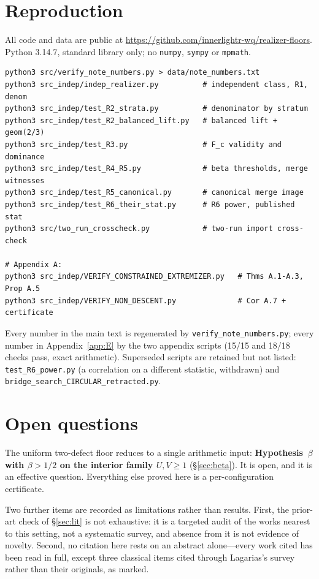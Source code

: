 \documentclass[11pt,a4paper]{article}
\theoremstyle{plain}
\theoremstyle{definition}
\begin{document}
\section{Reproduction}

All code and data are public at
\url{https://github.com/innerlightr-wq/realizer-floors}.
Python 3.14.7, standard library only; no \texttt{numpy}, \texttt{sympy} or
\texttt{mpmath}.

\begin{verbatim}
python3 src/verify_note_numbers.py > data/note_numbers.txt
python3 src_indep/indep_realizer.py          # independent class, R1, denom
python3 src_indep/test_R2_strata.py          # denominator by stratum
python3 src_indep/test_R2_balanced_lift.py   # balanced lift + geom(2/3)
python3 src_indep/test_R3.py                 # F_c validity and dominance
python3 src_indep/test_R4_R5.py              # beta thresholds, merge witnesses
python3 src_indep/test_R5_canonical.py       # canonical merge image
python3 src_indep/test_R6_their_stat.py      # R6 power, published stat
python3 src/two_run_crosscheck.py            # two-run import cross-check

# Appendix A:
python3 src_indep/VERIFY_CONSTRAINED_EXTREMIZER.py   # Thms A.1-A.3, Prop A.5
python3 src_indep/VERIFY_NON_DESCENT.py              # Cor A.7 + certificate
\end{verbatim}

Every number in the main text is regenerated by
\texttt{verify\_note\_numbers.py}; every number in Appendix~\ref{app:E} by the
two appendix scripts (15/15 and 18/18 checks pass, exact arithmetic).
Superseded scripts are retained but not listed: \texttt{test\_R6\_power.py}
(a correlation on a different statistic, withdrawn) and
\texttt{bridge\_search\_CIRCULAR\_retracted.py}.

\section*{Open questions}

The uniform two-defect floor reduces to a single arithmetic input:
\textbf{Hypothesis~$\beta$ with $\beta>1/2$ on the interior family
$U,V\ge1$} (\S\ref{sec:beta}). It is open, and it is an effective question.
Everything else proved here is a per-configuration certificate.

Two further items are recorded as limitations rather than results. First, the
prior-art check of \S\ref{sec:lit} is not exhaustive: it is a targeted audit of
the works nearest to this setting, not a systematic survey, and absence from it
is not evidence of novelty. Second, no citation here rests on an abstract
alone---every work cited has been read in full, except three classical items
cited through Lagarias's survey rather than their originals, as marked.
\end{document}
